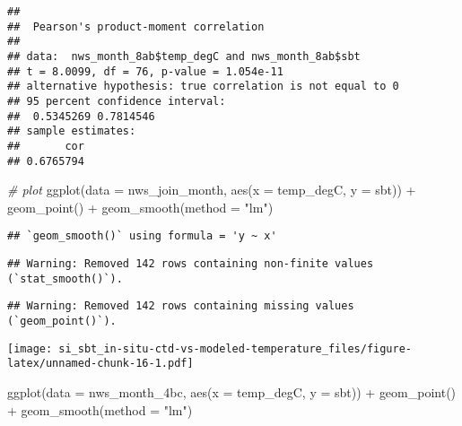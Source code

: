 \documentclass[
]{article}
\newenvironment{Shaded}{\begin{snugshade}}{\end{snugshade}}
\newcommand{\AttributeTok}[1]{\textcolor[rgb]{0.77,0.63,0.00}{#1}}
\newcommand{\CommentTok}[1]{\textcolor[rgb]{0.56,0.35,0.01}{\textit{#1}}}
\newcommand{\FunctionTok}[1]{\textcolor[rgb]{0.00,0.00,0.00}{#1}}
\newcommand{\NormalTok}[1]{#1}
\newcommand{\SpecialCharTok}[1]{\textcolor[rgb]{0.00,0.00,0.00}{#1}}
\newcommand{\StringTok}[1]{\textcolor[rgb]{0.31,0.60,0.02}{#1}}
\begin{document}
\begin{Shaded}
\end{Shaded}

\begin{verbatim}
## 
##  Pearson's product-moment correlation
## 
## data:  nws_month_8ab$temp_degC and nws_month_8ab$sbt
## t = 8.0099, df = 76, p-value = 1.054e-11
## alternative hypothesis: true correlation is not equal to 0
## 95 percent confidence interval:
##  0.5345269 0.7814546
## sample estimates:
##       cor 
## 0.6765794
\end{verbatim}

\begin{Shaded}
\begin{Highlighting}[]
\CommentTok{\# plot}
\FunctionTok{ggplot}\NormalTok{(}\AttributeTok{data =}\NormalTok{ nws\_join\_month, }\FunctionTok{aes}\NormalTok{(}\AttributeTok{x =}\NormalTok{ temp\_degC, }\AttributeTok{y =}\NormalTok{ sbt)) }\SpecialCharTok{+} \FunctionTok{geom\_point}\NormalTok{() }\SpecialCharTok{+} \FunctionTok{geom\_smooth}\NormalTok{(}\AttributeTok{method =} \StringTok{"lm"}\NormalTok{)}
\end{Highlighting}
\end{Shaded}

\begin{verbatim}
## `geom_smooth()` using formula = 'y ~ x'
\end{verbatim}

\begin{verbatim}
## Warning: Removed 142 rows containing non-finite values (`stat_smooth()`).
\end{verbatim}

\begin{verbatim}
## Warning: Removed 142 rows containing missing values (`geom_point()`).
\end{verbatim}

\texttt{[image: si\_sbt\_in-situ-ctd-vs-modeled-temperature\_files/figure-latex/unnamed-chunk-16-1.pdf]}

\begin{Shaded}
\begin{Highlighting}[]
\FunctionTok{ggplot}\NormalTok{(}\AttributeTok{data =}\NormalTok{ nws\_month\_4bc, }\FunctionTok{aes}\NormalTok{(}\AttributeTok{x =}\NormalTok{ temp\_degC, }\AttributeTok{y =}\NormalTok{ sbt)) }\SpecialCharTok{+} \FunctionTok{geom\_point}\NormalTok{() }\SpecialCharTok{+} \FunctionTok{geom\_smooth}\NormalTok{(}\AttributeTok{method =} \StringTok{"lm"}\NormalTok{)}
\end{Highlighting}
\end{Shaded}
\end{document}
